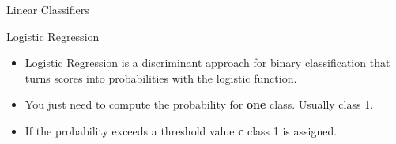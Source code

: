 \documentclass[11pt,compress,t,notes=noshow, xcolor=table]{beamer}
\begin{document}
\begin{vbframe}{Linear Classifiers}
\end{vbframe}

\begin{vbframe}{Logistic Regression}

\begin{itemize}
\item \small Logistic Regression is a discriminant approach for binary classification that turns scores into probabilities with the logistic function.
\item \small You just need to compute the probability for \textbf{one} class. Usually class 1.
\item \small If the probability exceeds a threshold value \textbf{c} class 1 is assigned.
\end{itemize}


\end{vbframe}
\end{document}
